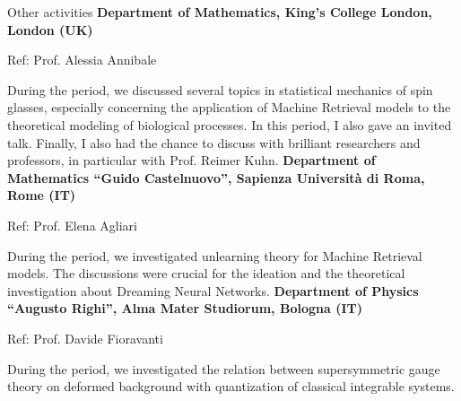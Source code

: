 \begin{rubric}{Other activities}
\entry*[1 -- 5 Oct 2018]
  \textbf{Department of Mathematics, King's College London, London (UK)}\par Ref: Prof. Alessia Annibale\par During the period, we discussed several topics in statistical mechanics of spin glasses, especially concerning the application of Machine Retrieval models to the theoretical modeling of biological processes. In this period, I also gave an invited talk. Finally, I also had the chance to discuss with brilliant researchers and professors, in particular with Prof. Reimer Kuhn.
\entry*[2018 (often)]
  \textbf{Department of Mathematics ``Guido Castelnuovo'', Sapienza Università di Roma, Rome (IT)}\par Ref: Prof. Elena Agliari\par During the period, we investigated unlearning theory for Machine Retrieval models. The discussions were crucial for the ideation and the theoretical investigation about Dreaming Neural Networks.
\entry*[2016 -- 2017 (often)]
  \textbf{Department of Physics ``Augusto Righi'', Alma Mater Studiorum, Bologna (IT)}\par Ref: Prof. Davide Fioravanti\par During the period, we investigated the relation between supersymmetric gauge theory on deformed background with quantization of classical integrable systems.
\end{rubric}
